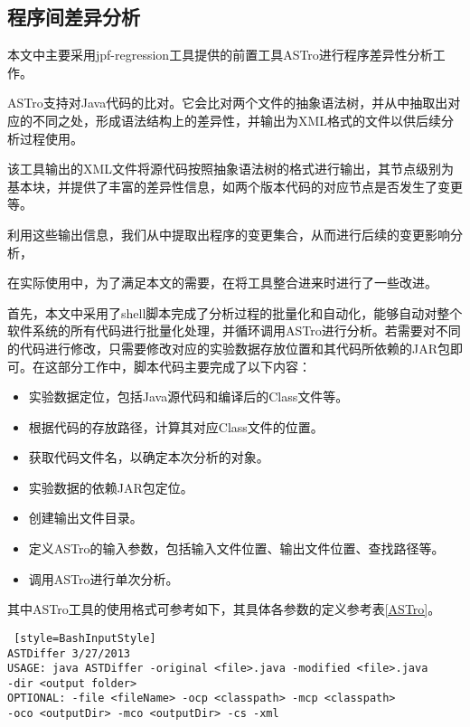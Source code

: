 \subsection{程序间差异分析}

本文中主要采用jpf-regression工具提供的前置工具ASTro进行程序差异性分析工作。

ASTro支持对Java代码的比对。它会比对两个文件的抽象语法树，并从中抽取出对应的不同之处，形成语法结构上的差异性，并输出为XML格式的文件以供后续分析过程使用。

该工具输出的XML文件将源代码按照抽象语法树的格式进行输出，其节点级别为基本块，并提供了丰富的差异性信息，如两个版本代码的对应节点是否发生了变更等。

利用这些输出信息，我们从中提取出程序的变更集合，从而进行后续的变更影响分析，

在实际使用中，为了满足本文的需要，在将工具整合进来时进行了一些改进。

首先，本文中采用了shell脚本完成了分析过程的批量化和自动化，能够自动对整个软件系统的所有代码进行批量化处理，并循环调用ASTro进行分析。若需要对不同的代码进行修改，只需要修改对应的实验数据存放位置和其代码所依赖的JAR包即可。在这部分工作中，脚本代码主要完成了以下内容：

\begin{itemize}
	\item 实验数据定位，包括Java源代码和编译后的Class文件等。
	\item 根据代码的存放路径，计算其对应Class文件的位置。
	\item 获取代码文件名，以确定本次分析的对象。
	\item 实验数据的依赖JAR包定位。
	\item 创建输出文件目录。
	\item 定义ASTro的输入参数，包括输入文件位置、输出文件位置、查找路径等。
	\item 调用ASTro进行单次分析。
\end{itemize}

其中ASTro工具的使用格式可参考如下，其具体各参数的定义参考表\ref {ASTro}。

\begin{lstlisting} [style=BashInputStyle]
ASTDiffer 3/27/2013
USAGE: java ASTDiffer -original <file>.java -modified <file>.java 
-dir <output folder>
OPTIONAL: -file <fileName> -ocp <classpath> -mcp <classpath> 
-oco <outputDir> -mco <outputDir> -cs -xml
\end{lstlisting}	

